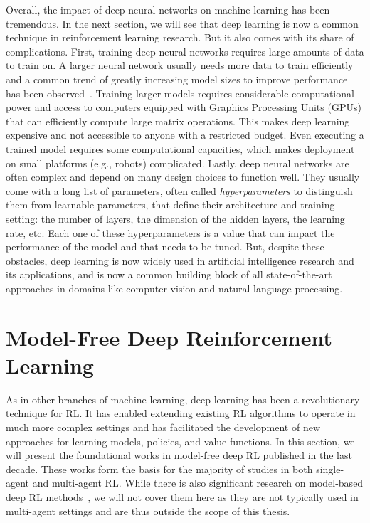 Overall, the impact of deep neural networks on machine learning has been tremendous. In the next section, we will see that deep learning is now a common technique in reinforcement learning research. But it also comes with its share of complications. First, training deep neural networks requires large amounts of data to train on. A larger neural network usually needs more data to train efficiently~\citep{Kaplan2020_ScalingLaws} and a common trend of greatly increasing model sizes to improve performance has been observed~\citep{Villalobos2022_ModelSizes}. Training larger models requires considerable computational power and access to computers equipped with Graphics Processing Units (GPUs) that can efficiently compute large matrix operations. This makes deep learning expensive and not accessible to anyone with a restricted budget. Even executing a trained model requires some computational capacities, which makes deployment on small platforms (e.g., robots) complicated. Lastly, deep neural networks are often complex and depend on many design choices to function well. They usually come with a long list of parameters, often called \textit{hyperparameters} to distinguish them from learnable parameters, that define their architecture and training setting: the number of layers, the dimension of the hidden layers, the learning rate, etc. Each one of these hyperparameters is a value that can impact the performance of the model and that needs to be tuned. But, despite these obstacles, deep learning is now widely used in artificial intelligence research and its applications, and is now a common building block of all state-of-the-art approaches in domains like computer vision and natural language processing.









\section{Model-Free Deep Reinforcement Learning}\label{sec:DRL}

As in other branches of machine learning, deep learning has been a revolutionary technique for RL. It has enabled extending existing RL algorithms to operate in much more complex settings and has facilitated the development of new approaches for learning models, policies, and value functions. In this section, we will present the foundational works in model-free deep RL published in the last decade. These works form the basis for the majority of studies in both single-agent and multi-agent RL. While there is also significant research on model-based deep RL methods~\citep{Moerland2023_ModelRL}, we will not cover them here as they are not typically used in multi-agent settings and are thus outside the scope of this thesis. 


